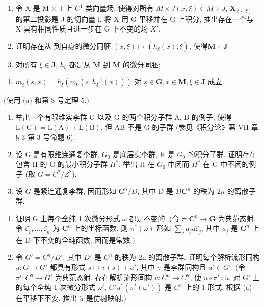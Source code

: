 \begin{enumerate}
\def\labelenumi{(\alph{enumi})}
\item
  令 X 是 M × J 上 \(C^{1}\) 类向量场, 使得对所有 \(M \times J\)\((x, \xi) \in M \times J\), \(\mathbf{X}_{(x, \xi)}\) 的第二投影是 J 的切向量 l. 将 X 用 G 平移并在 G 上积分, 推出存在一个与 X 具有相同性质且进一步在 G 下不变的场 \(X'\).
\item
  证明存在从  到自身的微分同胚 \((x, \xi) \mapsto (h_{\xi}(x), \xi)\), 使得\(\mathbf{M} \times \mathbf{J}\)
\item
  对所有 \(\xi \in \mathbf{J}\), \(h_{\xi}\) 都是从 \(\mathbf{M}\) 到 \(\mathbf{M}\) 的微分同胚;
\end{enumerate}

\begin{enumerate}
\def\labelenumi{(\roman{enumi})}
\setcounter{enumi}{1}
\tightlist
\item
  \(m_{\xi}(s,x) = h_{\xi}(m_0(s,h_{\xi}^{-1}(x)))\) 对 \(s\in \mathbf{G}, x\in \mathbf{M},\xi \in \mathbf{J}\) 成立.
\end{enumerate}

(使用 (a) 和第 8 号定理 5.)

\begin{enumerate}
\def\labelenumi{\arabic{enumi}.}
\setcounter{enumi}{27}
\item
  举出一个有限维实李群 G 以及 G 的两个积分子群 A, B 的例子, 使得 \(\mathrm{L}(\mathrm{G})=\mathrm{L}(\mathrm{A})+\mathrm{L}(\mathrm{B})\), 但 AB 不是 G 的子群 (参见《积分论》第 VII 章 § 3 第 3 号命题 6).
\item
  设 G 是有限维连通复李群, \(G_{0}\) 是底层实李群, H 是 \(G_{0}\) 的积分子群. 证明存在包含 H 的 G 的最小积分子群 \(H^{*}\). 举出 H 在 \(G_{0}\) 中闭而 \(H^{*}\) 在 G 中不闭的例子 (取 \(G = C^{2}/Z^{2}\)).
\item
  设 \(G\) 是紧连通复李群, 因而形如 \(\mathbf{C}^n / D\), 其中 D 是 \(D\)\(\mathbf{C}^n\) 的秩为 \(2n\) 的离散子群.
\end{enumerate}

\begin{enumerate}
\def\labelenumi{(\alph{enumi})}
\item
  证明 G 上每个全纯 1 次微分形式 \(\omega\) 都是不变的. (令 \(\pi: \mathbf{C}^n \to \mathbf{G}\) 为典范态射. 令 \(\zeta_1, \ldots, \zeta_n\) 为 \(\mathbf{C}^n\) 上的坐标函数. 则 \(\pi^*(\omega)\) 形如 \(\sum_j a_j d\zeta_{j}\), 其中 \(a_j\) 是 \(\mathbf{C}^n\) 上在 D 下不变的全纯函数, 因而是常数.)
\item
  令 \(G' = C^{n}/D'\), 其中 \(D'\) 是 \(C^{n}\) 的秩为 2n 的离散子群. 证明每个解析流形同构 \(u: G \to G'\) 都具有形式 \(s \mapsto v(s) + a'\), 其中 v 是李群同构且 \(a' \in G'\). (令 \(\pi': C^{n} \to G'\) 为典范态射. 存在解析流形同构 \(\tilde{u}: C^{n} \to C^{n}\), 使 \(u \circ \pi' \circ \tilde{u}\). 对 G' 上的每个全纯 1 次微分形式 \(\omega'\), \(G'\)\(u^*(\pi^*(\omega'))\) 是 \(C^{n}\) 上的 1-形式, 根据 (a) 在平移下不变. 推出 \(\tilde{u}\) 是仿射映射.)
\end{enumerate}

